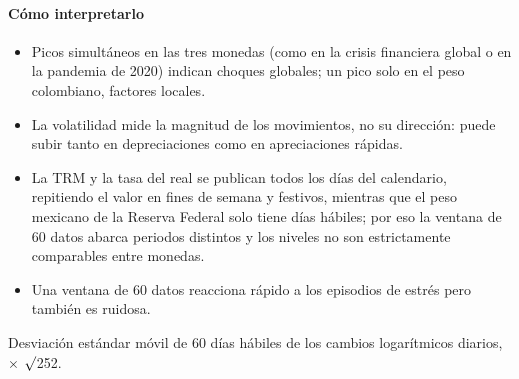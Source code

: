 \paragraph{Cómo interpretarlo}
\begin{itemize}
\item Picos simultáneos en las tres monedas (como en la crisis financiera global o en la pandemia de 2020) indican choques globales; un pico solo en el peso colombiano, factores locales.
\item La volatilidad mide la magnitud de los movimientos, no su dirección: puede subir tanto en depreciaciones como en apreciaciones rápidas.
\item La TRM y la tasa del real se publican todos los días del calendario, repitiendo el valor en fines de semana y festivos, mientras que el peso mexicano de la Reserva Federal solo tiene días hábiles; por eso la ventana de 60 datos abarca periodos distintos y los niveles no son estrictamente comparables entre monedas.
\item Una ventana de 60 datos reacciona rápido a los episodios de estrés pero también es ruidosa.
\end{itemize}
\begin{formulas}[Fórmulas]
\end{formulas}
\begin{metodo}[Metodología]
Desviación estándar móvil de 60 días hábiles de los cambios logarítmicos diarios, $\times$ $\surd$252.
\par{}
\end{metodo}

